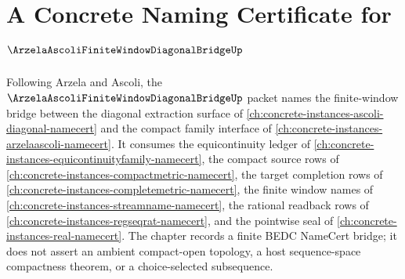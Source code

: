 \chapter{A Concrete Naming Certificate for $\ArzelaAscoliFiniteWindowDiagonalBridgeUp$}
\label{ch:concrete-instances-arzela-ascoli-finite-window-diagonal-bridge-namecert}

Following Arzela and Ascoli, the $\ArzelaAscoliFiniteWindowDiagonalBridgeUp$
packet names the finite-window bridge between the diagonal extraction surface
of \autoref{ch:concrete-instances-ascoli-diagonal-namecert} and the compact
family interface of \autoref{ch:concrete-instances-arzelaascoli-namecert}. It
consumes the equicontinuity ledger of
\autoref{ch:concrete-instances-equicontinuityfamily-namecert}, the compact
source rows of \autoref{ch:concrete-instances-compactmetric-namecert}, the
target completion rows of \autoref{ch:concrete-instances-completemetric-namecert},
the finite window names of \autoref{ch:concrete-instances-streamname-namecert},
the rational readback rows of \autoref{ch:concrete-instances-regseqrat-namecert},
and the pointwise seal of \autoref{ch:concrete-instances-real-namecert}. The
chapter records a finite BEDC NameCert bridge; it does not assert an ambient
compact-open topology, a host sequence-space compactness theorem, or a
choice-selected subsequence.

